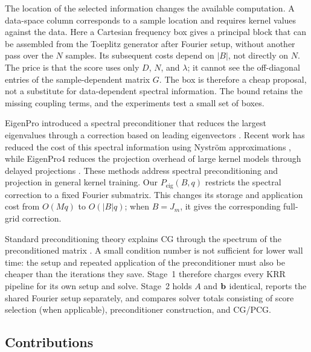 The location of the selected information changes the available computation.
A data-space column corresponds to a sample location and requires kernel
values against the data. Here a Cartesian frequency box gives a principal
block that can be assembled from the Toeplitz generator after Fourier setup,
without another pass over the \(N\) samples. Its subsequent costs depend on
\(|B|\), not directly on \(N\). The price is that the score uses only
\(D\), \(N\), and \(\lambda\); it cannot see the off-diagonal entries of
the sample-dependent matrix \(G\). The box is therefore a cheap proposal,
not a substitute for data-dependent spectral information. The bound retains
the missing coupling terms, and the experiments test a small set of boxes.

EigenPro introduced a spectral preconditioner that reduces the largest
eigenvalues through a correction based on leading eigenvectors
\cite{ma2017eigenpro,ma2019eigenpro,abedsoltan2023toward}.
Recent work has reduced the cost of this spectral information using
Nystr\"om approximations \cite{abedsoltan2024nystrom}, while EigenPro4
reduces the projection overhead of large kernel models through delayed
projections \cite{abedsoltan2025delayed}. These methods address spectral
preconditioning and projection in general kernel training. Our
\(P_{\mathrm{eig}}(B,q)\) restricts the spectral correction to a fixed Fourier
submatrix. This changes its storage and application cost from \(O(Mq)\) to
\(O(|B|q)\); when \(B=J_m\), it gives the corresponding full-grid correction.


Standard preconditioning theory explains CG through the spectrum of the
preconditioned matrix \cite{hestenes1952methods,saad2003iterative}. A small
condition number is not sufficient for lower wall time: the setup and repeated
application of the preconditioner must also be cheaper than the iterations they
save.  Stage~1 therefore charges every KRR pipeline for its own setup and solve.
Stage~2 holds \(A\) and \(\mathbf b\) identical, reports the shared Fourier setup
separately, and compares solver totals consisting of score selection (when
applicable), preconditioner construction, and CG/PCG.

\subsection{Contributions}
\label{subsec:main-contributions}

